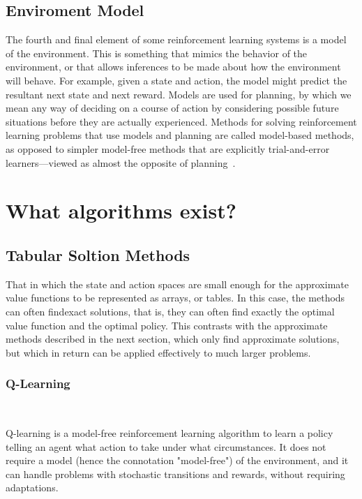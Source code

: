 \documentclass[letterpaper, 10 pt]{IEEEconf}
\begin{document}
\subsection{Enviroment Model}

The fourth and final element of some reinforcement learning systems is
a model of the environment. This is something that mimics the behavior
of the environment, or that allows inferences to be made about how the
environment will behave. For example, given a state and action, the
model might predict the resultant next state and next reward. Models
are used for planning, by which we mean any way of deciding on a
course of action by considering possible future situations before they
are actually experienced. Methods for solving reinforcement learning
problems that use models and planning are called model-based methods,
as opposed to simpler model-free methods that are explicitly
trial-and-error learners—viewed as almost the opposite of planning~\cite{sutton2018reinforcement}.

\section{What algorithms exist?}

\todo{}

\subsection{Tabular Soltion Methods}

That in which the state and action spaces are small enough for the approximate value functions to be represented as arrays, or tables. In this case, the methods can often findexact solutions, that is, they can often find exactly the optimal value function and the optimal policy. This contrasts with the approximate methods described in the next section, which only find approximate solutions, but which in return can be applied effectively to much larger problems.

\subsubsection{Q-Learning}

~\cite{watkins1989learning}

Q-learning is a model-free reinforcement learning algorithm to learn a policy telling an agent what action to take under what circumstances. It does not require a model (hence the connotation "model-free") of the environment, and it can handle problems with stochastic transitions and rewards, without requiring adaptations.
\end{document}
